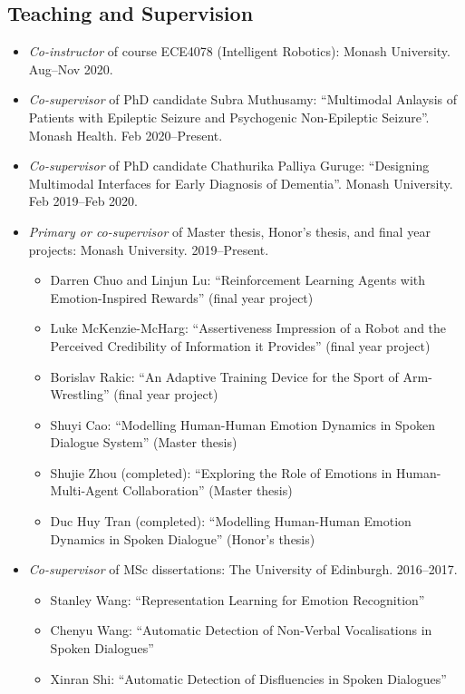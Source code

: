 \documentclass[11pt,letterpaper]{article}
\begin{document}
\subsection*{Teaching and Supervision}
\begin{itemize}
  \item \emph{Co-instructor} of course ECE4078 (Intelligent Robotics): Monash University. Aug--Nov 2020.
  \item \emph{Co-supervisor} of PhD candidate Subra Muthusamy: ``Multimodal Anlaysis of Patients with Epileptic Seizure and Psychogenic Non-Epileptic Seizure''. Monash Health. Feb 2020--Present.
  \item \emph{Co-supervisor} of PhD candidate Chathurika Palliya Guruge: ``Designing Multimodal Interfaces for Early Diagnosis of Dementia''. Monash University. Feb 2019--Feb 2020.
  \item \emph{Primary or co-supervisor} of Master thesis, Honor's thesis, and final year projects: Monash University. 2019--Present.
  \begin{itemize}
    \item Darren Chuo and Linjun Lu: ``Reinforcement Learning Agents with Emotion-Inspired Rewards'' (final year project)
    \item Luke McKenzie-McHarg: ``Assertiveness Impression of a Robot and the Perceived Credibility of Information it Provides'' (final year project)
    \item Borislav Rakic: ``An Adaptive Training Device for the Sport of Arm-Wrestling'' (final year project)
    \item Shuyi Cao: ``Modelling Human-Human Emotion Dynamics in Spoken Dialogue System'' (Master thesis)
    \item Shujie Zhou (completed): ``Exploring the Role of Emotions in Human-Multi-Agent Collaboration'' (Master thesis)
    \item Duc Huy Tran (completed): ``Modelling Human-Human Emotion Dynamics in Spoken Dialogue'' (Honor's thesis)
  \end{itemize}
  \item \emph{Co-supervisor} of MSc dissertations: The University of Edinburgh. 2016--2017.
  \begin{itemize}
    \item Stanley Wang: ``Representation Learning for Emotion Recognition''
    \item Chenyu Wang: ``Automatic Detection of Non-Verbal Vocalisations in Spoken Dialogues''
    \item Xinran Shi: ``Automatic Detection of Disfluencies in Spoken Dialogues''
  \end{itemize}
\end{itemize}
\end{document}
